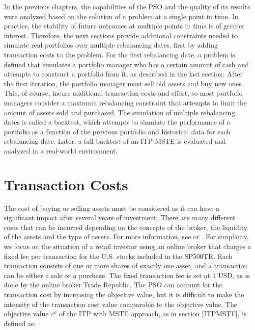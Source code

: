 \documentclass[
  oneside, a4paper, 12pt, openany]{book}
\theoremstyle{definition}
\theoremstyle{definition}
\theoremstyle{definition}
\theoremstyle{definition}
\theoremstyle{remark}
\begin{document}
In the previous chapters, the capabilities of the PSO and the quality of its results were analyzed based on the solution of a problem at a single point in time. In practice, the stability of future outcomes at multiple points in time is of greater interest. Therefore, the next sections provide additional constraints needed to simulate real portfolios over multiple rebalancing dates, first by adding transaction costs to the problem. For the first rebalancing date, a problem is defined that simulates a portfolio manager who has a certain amount of cash and attempts to construct a portfolio from it, as described in the last section. After the first iteration, the portfolio manager must sell old assets and buy new ones. This, of course, incurs additional transaction costs and effort, so most portfolio managers consider a maximum rebalancing constraint that attempts to limit the amount of assets sold and purchased. The simulation of multiple rebalancing dates is called a backtest, which attempts to simulate the performance of a portfolio as a function of the previous portfolio and historical data for each rebalancing date. Later, a full backtest of an ITP-MSTE is evaluated and analyzed in a real-world environment.

\hypertarget{transaction-costs}{%
\section{Transaction Costs}\label{transaction-costs}}

The cost of buying or selling assets must be considered as it can have a significant impact after several years of investment. There are many different costs that can be incurred depending on the concepts of the broker, the liquidity of the assets and the type of assets. For more information, see \citep{AkGa2022} or \citep{NySe2022}. For simplicity, we focus on the situation of a retail investor using an online broker that charges a fixed fee per transaction for the U.S. stocks included in the SP500TR. Each transaction consists of one or more shares of exactly one asset, and a transaction can be either a sale or a purchase. The fixed transaction fee is set at 1 USD, as is done by the online broker Trade Republic. The PSO can account for the transaction cost by increasing the objective value, but it is difficult to make the intensity of the transaction cost value comparable to the objective value. The objective value \(v^o\) of the ITP with MSTE approach, as in section \ref{ITPMSTE}, is defined as:
\end{document}
